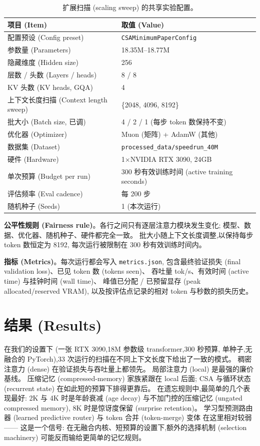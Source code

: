\documentclass[10pt,UTF8]{ctexart}
\begin{document}
\begin{table}[H]
\centering
\small
\caption{扩展扫描 (scaling sweep) 的共享实验配置。}
\label{tab:setup}
\begin{tabular}{@{}ll@{}}
\toprule
项目 (Item) & 取值 (Value) \\
\midrule
配置预设 (Config preset) & \texttt{CSAMinimumPaperConfig} \\
参数量 (Parameters) & 18.35M--18.77M \\
隐藏维度 (Hidden size) & 256 \\
层数 / 头数 (Layers / heads) & 8 / 8 \\
KV 头数 (KV heads, GQA) & 4 \\
上下文长度扫描 (Context length sweep) & \{2048, 4096, 8192\} \\
批大小 (Batch size, 已调) & 4 / 2 / 1 (每步 token 数保持不变) \\
优化器 (Optimizer) & Muon (矩阵) + AdamW (其他) \\
数据集 (Dataset) & \texttt{processed\_data/speedrun\_40M} \\
硬件 (Hardware) & 1$\times$NVIDIA RTX 3090, 24GB \\
单次预算 (Budget per run) & 300 秒有效训练时间 (active training seconds) \\
评估频率 (Eval cadence) & 每 200 步 \\
随机种子 (Seeds) & 1 (本次运行) \\
\bottomrule
\end{tabular}
\end{table}

\textbf{公平性规则 (Fairness rule)}。各行之间只有逐层注意力模块发生变化;
模型、数据、优化器、随机种子、硬件都完全一致。
批大小随上下文长度调整,以保持每步 token 数恒定为 8192,
每次运行被限制在 300 秒有效训练时间内。

\textbf{指标 (Metrics)}。每次运行都会写入 \texttt{metrics.json},
包含最终验证损失 (final validation loss)、已见 token 数 (tokens seen)、
吞吐量 tok/s、有效时间 (active time) 与挂钟时间 (wall time)、
峰值已分配 / 已预留显存 (peak allocated/reserved VRAM),
以及按评估点记录的相对 token 与秒数的损失历史。

\section{结果 (Results)}

在我们的设置下 (一张 RTX 3090,18M 参数级 transformer,300 秒预算,
单种子,无融合的 PyTorch),33 次运行的扫描在不同上下文长度下给出了一致的模式。
稠密注意力 (dense) 在验证损失与吞吐量上都领先。
局部注意力 (local) 是最强的廉价基线。
压缩记忆 (compressed-memory) 家族紧跟在 local 后面;
CSA 与循环状态 (recurrent state) 在如此短的预算下排得更靠后。
在遗忘规则中,最简单的几个表现最好:
2K 与 4K 时是年龄衰减 (age decay) 与不加门控的压缩记忆 (ungated compressed memory),
8K 时是惊讶度保留 (surprise retention)。
学习型预测路由器 (learned predictive router) 与 token 合并 (token-merge) 变体
在这里相对较弱 —— 这是一个信号:
在无融合内核、短预算的设置下,额外的选择机制 (selection machinery)
可能反而输给更简单的记忆规则。
\end{document}
